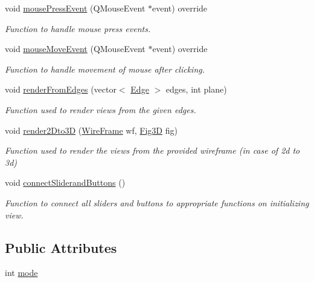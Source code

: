 \begin{DoxyCompactItemize}
void \hyperlink{classMainWindow_a1dff511c9697cbcb60150894f480b9c8}{mouse\+Press\+Event} (Q\+Mouse\+Event $\ast$event) override
\begin{DoxyCompactList}\small\item\em Function to handle mouse press events. \end{DoxyCompactList}\item 
void \hyperlink{classMainWindow_a9c8748d463f01ddae6abcd8f8163fcef}{mouse\+Move\+Event} (Q\+Mouse\+Event $\ast$event) override
\begin{DoxyCompactList}\small\item\em Function to handle movement of mouse after clicking. \end{DoxyCompactList}\item 
void \hyperlink{classMainWindow_a3309de2dae8bbfaf0ff645fe372aa644}{render\+From\+Edges} (vector$<$ \hyperlink{structEdge}{Edge} $>$ edges, int plane)
\begin{DoxyCompactList}\small\item\em Function used to render views from the given edges. \end{DoxyCompactList}\item 
void \hyperlink{classMainWindow_a91288f71f3b29443c1243ddb653f3898}{render2\+Dto3D} (\hyperlink{classWireFrame}{Wire\+Frame} wf, \hyperlink{classFig3D}{Fig3D} fig)
\begin{DoxyCompactList}\small\item\em Function used to render the views from the provided wireframe (in case of 2d to 3d) \end{DoxyCompactList}\item 
void \hyperlink{classMainWindow_acc4ea38c583bc825f258ab2ec432e835}{connect\+Sliderand\+Buttons} ()
\begin{DoxyCompactList}\small\item\em Function to connect all sliders and buttons to appropriate functions on initializing view. \end{DoxyCompactList}\end{DoxyCompactItemize}
\subsection*{Public Attributes}
\begin{DoxyCompactItemize}
\item 
int \hyperlink{classMainWindow_a0d680234c97ecdc151020dd0ec09cc54}{mode}
\end{DoxyCompactItemize}


